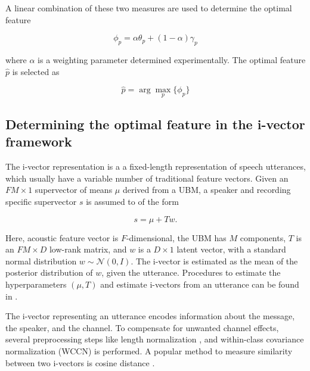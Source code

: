 \documentclass{article}
\begin{document}


A linear combination of these two measures are used to determine the optimal
feature

\begin{equation}
\phi_p = \alpha \theta_p  + (1-\alpha) \gamma_p
\end{equation}

where $\alpha$ is a weighting parameter determined experimentally. The optimal
feature $\hat{p}$ is selected as 

\begin{equation}
\hat{p} = \arg\max_p \{\phi_p\}
\label{eq:optFeat}
\end{equation}

\subsection{Determining the optimal feature in the i-vector framework}

The i-vector representation \cite{dehak_ivector} is a a fixed-length
representation of speech utterances, which usually have a variable number of
traditional feature vectors.  Given an $FM \times 1$ supervector of means $\mu$
derived from a UBM, a speaker and recording specific supervector $s$ is assumed to of
the form

\begin{equation}
s = \mu + T w.
\end{equation}

Here, acoustic feature vector is $F$-dimensional, the UBM has $M$ components,
$T$ is an $FM \times D$ low-rank matrix, and $w$ is a $D \times 1$ latent
vector, with a standard normal distribution $w \sim \mathcal{N}(0,I)$. The
i-vector is estimated as the mean of the posterior distribution of $w$, given
the utterance. Procedures to estimate the hyperparameters $(\mu, T)$ and 
estimate i-vectors from an utterance can be found in \cite{dehak_ivector}.

The i-vector representing an utterance encodes information about the message,
the speaker, and the channel. To compensate for unwanted channel effects,
several preprocessing steps like length normalization \cite{garcia_lengthNorm},
and within-class covariance normalization (WCCN) \cite{wccn} is performed. A
popular method to measure similarity between two i-vectors is cosine 
distance \cite{dehak_ivector}.
\end{document}
